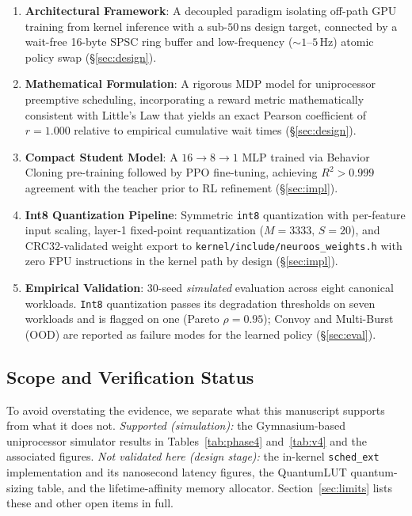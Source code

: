 \begin{enumerate}
  \item \textbf{Architectural Framework}: A decoupled paradigm isolating
    off-path GPU training from kernel inference with a sub-$50\,\text{ns}$
    design target, connected
    by a wait-free 16-byte SPSC ring buffer and low-frequency ($\sim 1\text{--}5\,\text{Hz}$)
    atomic policy swap (\S\ref{sec:design}).

  \item \textbf{Mathematical Formulation}: A rigorous MDP model for uniprocessor
    preemptive scheduling, incorporating a reward metric mathematically consistent with
    Little's Law that yields an exact Pearson coefficient of $r = 1.000$ relative to
    empirical cumulative wait times (\S\ref{sec:design}).

  \item \textbf{Compact Student Model}: A $16\to 8\to 1$ MLP trained via
    Behavior Cloning pre-training followed by PPO fine-tuning, achieving
    $R^2 > 0.999$ agreement with the teacher prior to RL refinement
    (\S\ref{sec:impl}).

  \item \textbf{Int8 Quantization Pipeline}: Symmetric \texttt{int8}
    quantization with per-feature input scaling, layer-1 fixed-point
    requantization ($M = 3333,\,S = 20$), and CRC32-validated weight export to
    \texttt{kernel/include/neuroos\_weights.h} with zero FPU instructions in
    the kernel path by design (\S\ref{sec:impl}).

  \item \textbf{Empirical Validation}: 30-seed \emph{simulated} evaluation across eight
    canonical workloads. \texttt{Int8} quantization passes its degradation
    thresholds on seven workloads and is flagged on one (Pareto
    $\rho = 0.95$); Convoy and Multi-Burst (OOD) are reported as failure modes
    for the learned policy (\S\ref{sec:eval}).
\end{enumerate}

\subsection*{Scope and Verification Status}

To avoid overstating the evidence, we separate what this manuscript supports
from what it does not. \emph{Supported (simulation):} the Gymnasium-based
uniprocessor simulator results in Tables~\ref{tab:phase4} and~\ref{tab:v4} and
the associated figures. \emph{Not validated here (design stage):} the in-kernel
\texttt{sched\_ext} implementation and its nanosecond latency figures, the
QuantumLUT quantum-sizing table, and the lifetime-affinity memory allocator.
Section~\ref{sec:limits} lists these and other open items in full.

